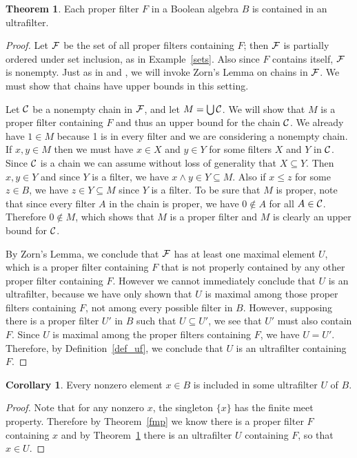 \documentclass[11pt,titlepage]{article}
\newcommand{\cC}{\cal{C}}
\newcommand{\cF}{\cal{F}}
\theoremstyle{definition}
\newtheorem{theorem}[definition]{Theorem}
\newtheorem{corollary}[definition]{Corollary}
\begin{document}
\begin{theorem}\label{ultra_exis} Each proper filter $F$ in a Boolean algebra $B$ is contained in an ultrafilter. \end{theorem}
\begin{proof} Let $\cF$ be the set of all proper filters containing $F$; then $\cF$ is partially ordered under set inclusion, as in Example~\ref{sets}. Also since $F$ contains itself, $\cF$ is nonempty. Just as in \cite{Bell} and \cite{Fraleigh}, we will invoke Zorn's Lemma on chains in $\cF$. We must show that chains have upper bounds in this setting.

Let $\cC$ be a nonempty chain in $\cF$, and let $M=\bigcup\cC$. We will show that $M$ is a proper filter containing $F$ and thus an upper bound for the chain $\cC$. We already have $1\in M$ because 1 is in every filter and we are considering a nonempty chain. If $x, y\in M$ then we must have $x\in X$ and $y\in Y$ for some filters $X$ and $Y$ in $\cC$. Since $\cC$ is a chain we can assume without loss of generality that $X\subseteq Y$. Then $x,y\in Y$ and since $Y$ is a filter, we have $x\land y \in Y\subseteq M$. Also if $x\leq z$ for some $z\in B$, we have $z\in Y \subseteq M$ since $Y$ is a filter. To be sure that $M$ is proper, note that since every filter $A$ in the chain is proper, we have $0\notin A$ for all $A\in \cC$. Therefore $0\notin M$, which shows that $M$ is a proper filter and $M$ is clearly an upper bound for $\cC$.

By Zorn's Lemma, we conclude that $\cF$ has at least one maximal element $U$, which is a proper filter containing $F$ that is not properly contained by any other proper filter containing $F$. However we cannot immediately conclude that $U$ is an ultrafilter, because we have only shown that $U$ is maximal among those proper filters containing $F$, not among every possible filter in $B$. However, supposing there is a proper filter $U'$ in $B$ such that $U\subseteq U'$, we see  that $U'$ must also contain $F$. Since $U$ is maximal among the proper filters containing $F$, we have $U=U'$. Therefore, by Definition~\ref{def_uf}, we conclude that $U$ is an ultrafilter containing $F$.\end{proof}

\begin{corollary}\label{existence} Every nonzero element $x\in B$ is included in some ultrafilter $U$ of $B$. \end{corollary}
\begin{proof} Note that for any nonzero $x$, the singleton $\{x\}$ has the finite meet property. Therefore by Theorem~\ref{fmp} we know there is a proper filter $F$ containing $x$ and by Theorem~\ref{ultra_exis} there is an ultrafilter $U$ containing $F$, so that $x\in U$. \end{proof}
\end{document}
